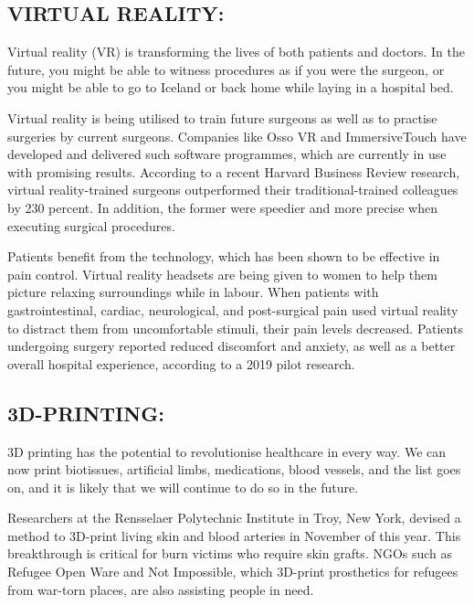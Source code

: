 \documentclass[12pt]{article}
\begin{document}
\subsection{VIRTUAL REALITY:}

Virtual reality (VR) is transforming the lives of both patients and doctors. In the future, you might be able to witness procedures as if you were the surgeon, or you might be able to go to Iceland or back home while laying in a hospital bed.




Virtual reality is being utilised to train future surgeons as well as to practise surgeries by current surgeons. Companies like Osso VR and ImmersiveTouch have developed and delivered such software programmes, which are currently in use with promising results. According to a recent Harvard Business Review research, virtual reality-trained surgeons outperformed their traditional-trained colleagues by 230 percent. In addition, the former were speedier and more precise when executing surgical procedures.





Patients benefit from the technology, which has been shown to be effective in pain control. Virtual reality headsets are being given to women to help them picture relaxing surroundings while in labour. When patients with gastrointestinal, cardiac, neurological, and post-surgical pain used virtual reality to distract them from uncomfortable stimuli, their pain levels decreased. Patients undergoing surgery reported reduced discomfort and anxiety, as well as a better overall hospital experience, according to a 2019 pilot research.


\subsection{3D-PRINTING:}



3D printing has the potential to revolutionise healthcare in every way. We can now print biotissues, artificial limbs, medications, blood vessels, and the list goes on, and it is likely that we will continue to do so in the future.

Researchers at the Rensselaer Polytechnic Institute in Troy, New York, devised a method to 3D-print living skin and blood arteries in November of this year. This breakthrough is critical for burn victims who require skin grafts. NGOs such as Refugee Open Ware and Not Impossible, which 3D-print prosthetics for refugees from war-torn places, are also assisting people in need.
\end{document}
